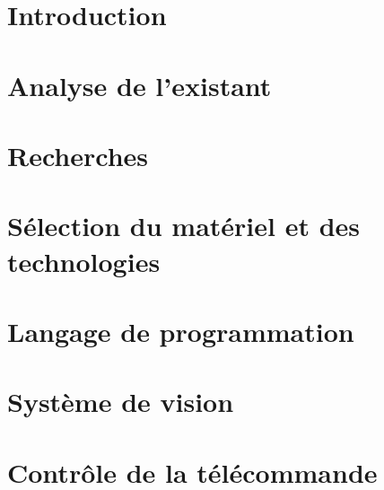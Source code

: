 \documentclass[
    iai, %
    eai, %
]{heig-tb}
\begin{document}
\maketitle
\frontmatter
\clearemptydoublepage

\preamble
\authentification

\begin{abstract}
    
\end{abstract}

\clearemptydoublepage
{
    \tableofcontents
    \let\cleardoublepage\clearpage
    \listoffigures
    \let\cleardoublepage\clearpage
    \listoftables
    \let\cleardoublepage\clearpage
    \listoflistings
}

\printnomenclature
\clearemptydoublepage
{}

\mainmatter
\chapter{Introduction}

%

\chapter{Analyse de l'existant}
\label{chap:exi}


\chapter{Recherches}


\chapter{Sélection du matériel et des technologies}


\chapter{Langage de programmation}


\chapter{Système de vision}


\chapter{Contrôle de la télécommande}

\end{document}
